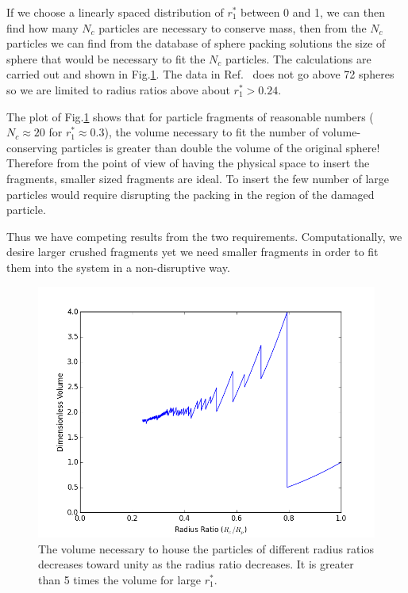 If we choose a linearly spaced distribution of $r_1^*$ between 0 and 1, we can then find how many $N_c$ particles are necessary to conserve mass, then from the $N_c$ particles we can find from the database of sphere packing solutions the size of sphere that would be necessary to fit the $N_c$ particles. The calculations are carried out and shown in Fig.\ref{fig:volume-ratio}. The data in Ref.~\cite{gensane2003dense} does not go above 72 spheres so we are limited to radius ratios above about $r_1^* > 0.24$.

The plot of Fig.\ref{fig:volume-ratio} shows that for particle fragments of reasonable numbers ($N_c\approx 20$ for $r_1^*\approx 0.3$), the volume necessary to fit the number of volume-conserving particles is greater than double the volume of the original sphere! Therefore from the point of view of having the physical space to insert the fragments, smaller sized fragments are ideal. To insert the few number of large particles would require disrupting the packing in the region of the damaged particle.

Thus we have competing results from the two requirements. Computationally, we desire larger crushed fragments yet we need smaller fragments in order to fit them into the system in a non-disruptive way.

\begin{figure}[!t]
\centering
    \includegraphics[width=\singleimagewidth]{chapters/figures/crush-fragments/fragment-volume-ratio.png}
    \caption{The volume necessary to house the particles of different radius ratios decreases toward unity as the radius ratio decreases. It is greater than 5 times the volume for large $r_1^*$.}
    \label{fig:volume-ratio}
\end{figure}




